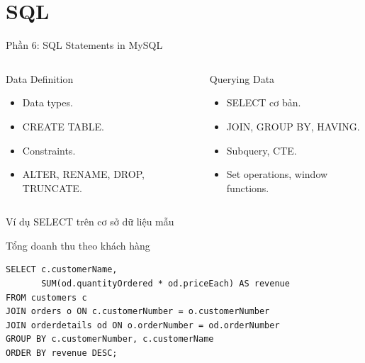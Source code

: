\documentclass[aspectratio=169,11pt]{beamer}
\begin{document}
\section{SQL}
\begin{frame}{Phần 6: SQL Statements in MySQL}
\begin{columns}[T,onlytextwidth]
\begin{block}{Data Definition}
\begin{itemize}
  \item Data types.
  \item CREATE TABLE.
  \item Constraints.
  \item ALTER, RENAME, DROP, TRUNCATE.
\end{itemize}
\end{block}
\begin{block}{Querying Data}
\begin{itemize}
  \item SELECT cơ bản.
  \item JOIN, GROUP BY, HAVING.
  \item Subquery, CTE.
  \item Set operations, window functions.
\end{itemize}
\end{block}
\end{columns}
\end{frame}

\begin{frame}[fragile]{Ví dụ SELECT trên cơ sở dữ liệu mẫu}
\begin{block}{Tổng doanh thu theo khách hàng}
\begin{verbatim}
SELECT c.customerName,
       SUM(od.quantityOrdered * od.priceEach) AS revenue
FROM customers c
JOIN orders o ON c.customerNumber = o.customerNumber
JOIN orderdetails od ON o.orderNumber = od.orderNumber
GROUP BY c.customerNumber, c.customerName
ORDER BY revenue DESC;
\end{verbatim}
\end{block}
\end{frame}
\end{document}
